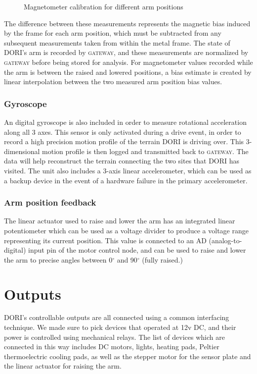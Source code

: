     
\begin{figure}[h]
    \scriptsize
    \centering
    
    \caption{Magnetometer calibration for different arm positions}
\end{figure}
    
    The difference between these measurements represents the magnetic bias induced by the frame for each arm position, which must be subtracted from any subsequent measurements taken from within the metal frame. The state of DORI's arm is recorded by \textsc{gateway}, and these measurements are normalized by \textsc{gateway} before being stored for analysis. For magnetometer values recorded while the arm is between the raised and lowered positions, a bias estimate is created by linear interpolation between the two measured arm position bias values.

    \subsubsection*{Gyroscope}
    An  digital gyroscope is also included in order to measure rotational acceleration along all 3 axes. This sensor is only activated during a drive event, in order to record a high precision motion profile of the terrain DORI is driving over. This 3-dimensional motion profile is then logged and transmitted back to \textsc{gateway}. The data will help reconstruct the terrain connecting the two sites that DORI has visited. The  unit also includes a 3-axis linear accelerometer, which can be used as a backup device in the event of a hardware failure in the primary accelerometer.

    \subsubsection*{Arm position feedback}
    The linear actuator used to raise and lower the arm has an integrated linear potentiometer which can be used as a voltage divider to produce a voltage range representing its current position. This value is connected to an AD (analog-to-digital) input pin of the motor control node, and can be used to raise and lower the arm to precise angles between 0$^\circ$ and 90$^\circ$ (fully raised.) 


\section{Outputs}
    DORI's controllable outputs are all connected using a common interfacing technique. We made sure to pick devices that operated at 12v DC, and their power is controlled using mechanical relays. The list of devices which are connected in this way includes DC motors, lights, heating pads, Peltier thermoelectric cooling pads, as well as the stepper motor for the sensor plate and the linear actuator for raising the arm.

